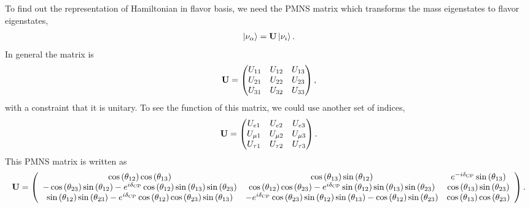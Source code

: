 \documentclass[letterpaper,12pt,english]{sphinxmanual}
\newcommand{\ket}[1]{\left| #1\right\rangle}
\begin{document}
To find out the representation of Hamiltonian in flavor basis, we need the PMNS matrix which transforms the mass eigenstates to flavor eigenstates,
\begin{gather}
\begin{split}\ket{\nu_\alpha}= \mathbf{U}\ket{\nu_i}.\end{split}\notag
\end{gather}
In general the matrix is
\begin{gather}
\begin{split}\mathbf U = \begin{pmatrix}
U_{11} & U_{12} & U_{13} \\
U_{21} & U_{22} & U_{23} \\
U_{31} & U_{32} & U_{33}
\end{pmatrix},\end{split}\notag
\end{gather}
with a constraint that it is unitary. To see the function of this matrix, we could use another set of indices,
\begin{gather}
\begin{split}\mathbf{U} = \begin{pmatrix}
U_{e1} & U_{e2} & U_{e3} \\
U_{\mu 1} & U_{\mu 2} & U_{\mu 3}\\
U_{\tau 1} & U_{\tau 2} & U_{\tau 3}
\end{pmatrix}.\end{split}\notag
\end{gather}
This PMNS matrix is written as
\begin{gather}
\begin{split}\mathbf{U} = \left(
\begin{array}{ccc}
 \cos \left(\theta _{12}\right) \cos \left(\theta _{13}\right) & \cos \left(\theta _{13}\right) \sin \left(\theta _{12}\right) & e^{-i \delta _{\text{CP}}} \sin \left(\theta _{13}\right) \\
 -\cos \left(\theta _{23}\right) \sin \left(\theta _{12}\right)-e^{i \delta _{\text{CP}}} \cos \left(\theta _{12}\right) \sin \left(\theta _{13}\right) \sin \left(\theta _{23}\right) & \cos \left(\theta _{12}\right) \cos \left(\theta _{23}\right)-e^{i \delta _{\text{CP}}} \sin \left(\theta _{12}\right) \sin \left(\theta _{13}\right) \sin \left(\theta _{23}\right) & \cos \left(\theta _{13}\right) \sin \left(\theta _{23}\right) \\
 \sin \left(\theta _{12}\right) \sin \left(\theta _{23}\right)-e^{i \delta _{\text{CP}}} \cos \left(\theta _{12}\right) \cos \left(\theta _{23}\right) \sin \left(\theta _{13}\right) & -e^{i \delta _{\text{CP}}} \cos \left(\theta _{23}\right) \sin \left(\theta _{12}\right) \sin \left(\theta _{13}\right)-\cos \left(\theta _{12}\right) \sin \left(\theta _{23}\right) & \cos \left(\theta _{13}\right) \cos \left(\theta _{23}\right) \\
\end{array}
\right).\end{split}\notag
\end{gather}
\end{document}
